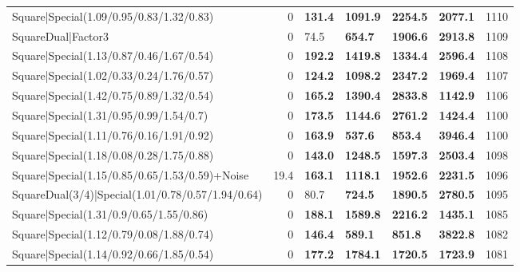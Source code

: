 \begin{tabular}{lrllllr}
 Square|Special(1.09/0.95/0.83/1.32/0.83)                      &             0   & \textbf{131.4} & \textbf{1091.9} & \textbf{2254.5} & \textbf{2077.1} &         1110 \\
 SquareDual|Factor3                                            &             0   & 74.5           & \textbf{654.7}  & \textbf{1906.6} & \textbf{2913.8} &         1109 \\
 Square|Special(1.13/0.87/0.46/1.67/0.54)                      &             0   & \textbf{192.2} & \textbf{1419.8} & \textbf{1334.4} & \textbf{2596.4} &         1108 \\
 Square|Special(1.02/0.33/0.24/1.76/0.57)                      &             0   & \textbf{124.2} & \textbf{1098.2} & \textbf{2347.2} & \textbf{1969.4} &         1107 \\
 Square|Special(1.42/0.75/0.89/1.32/0.54)                      &             0   & \textbf{165.2} & \textbf{1390.4} & \textbf{2833.8} & \textbf{1142.9} &         1106 \\
 Square|Special(1.31/0.95/0.99/1.54/0.7)                       &             0   & \textbf{173.5} & \textbf{1144.6} & \textbf{2761.2} & \textbf{1424.4} &         1100 \\
 Square|Special(1.11/0.76/0.16/1.91/0.92)                      &             0   & \textbf{163.9} & \textbf{537.6}  & \textbf{853.4}  & \textbf{3946.4} &         1100 \\
 Square|Special(1.18/0.08/0.28/1.75/0.88)                      &             0   & \textbf{143.0} & \textbf{1248.5} & \textbf{1597.3} & \textbf{2503.4} &         1098 \\
 Square|Special(1.15/0.85/0.65/1.53/0.59)+Noise                &            19.4 & \textbf{163.1} & \textbf{1118.1} & \textbf{1952.6} & \textbf{2231.5} &         1096 \\
 SquareDual(3/4)|Special(1.01/0.78/0.57/1.94/0.64)             &             0   & 80.7           & \textbf{724.5}  & \textbf{1890.5} & \textbf{2780.5} &         1095 \\
 Square|Special(1.31/0.9/0.65/1.55/0.86)                       &             0   & \textbf{188.1} & \textbf{1589.8} & \textbf{2216.2} & \textbf{1435.1} &         1085 \\
 Square|Special(1.12/0.79/0.08/1.88/0.74)                      &             0   & \textbf{146.4} & \textbf{589.1}  & \textbf{851.8}  & \textbf{3822.8} &         1082 \\
 Square|Special(1.14/0.92/0.66/1.85/0.54)                      &             0   & \textbf{177.2} & \textbf{1784.1} & \textbf{1720.5} & \textbf{1723.9} &         1081 \\

\end{tabular}
